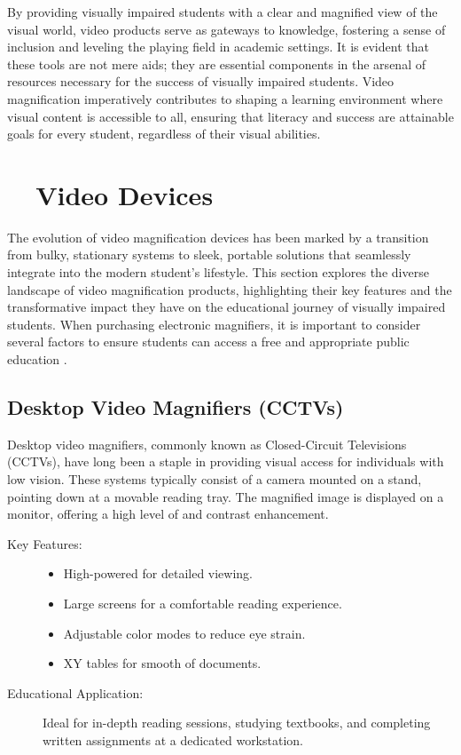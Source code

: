 By providing visually impaired students with a clear and magnified view of the visual world, video  products serve as gateways to knowledge, fostering a sense of inclusion and leveling the playing field in academic settings. It is evident that these tools are not mere aids; they are essential components in the arsenal of resources necessary for the success of visually impaired students. Video magnification imperatively contributes to shaping a learning environment where visual content is accessible to all, ensuring that literacy and success are attainable goals for every student, regardless of their visual abilities.\supercite{Kelly2011, Burgstahler2015}

\section{~~Video  Devices}\label{ch6:sec:video-magnification-devices}
The evolution of video magnification devices has been marked by a transition from bulky, stationary systems to sleek, portable solutions that seamlessly integrate into the modern student's lifestyle. This section explores the diverse landscape of video magnification products, highlighting their key features and the transformative impact they have on the educational journey of visually impaired students. When purchasing electronic magnifiers, it is important to consider several factors to ensure students can access a free and appropriate public education \supercite{PerkinsVideoMagnifier}.

\subsection{Desktop Video Magnifiers (CCTVs)}
Desktop video magnifiers, commonly known as Closed-Circuit Televisions (CCTVs), have long been a staple in providing visual access for individuals with low vision. These systems typically consist of a camera mounted on a stand, pointing down at a movable reading tray. The magnified image is displayed on a monitor, offering a high level of  and contrast enhancement.\supercite{AFBMagnification}

\begin{description}
	\item[Key Features:]
	      \begin{itemize}
		      \item High-powered  for detailed viewing.
		      \item Large screens for a comfortable reading experience.
		      \item Adjustable color modes to reduce eye strain.
		      \item XY tables for smooth  of documents.
	      \end{itemize}
	\item[Educational Application:] Ideal for in-depth reading sessions, studying textbooks, and completing written assignments at a dedicated workstation.
\end{description}

